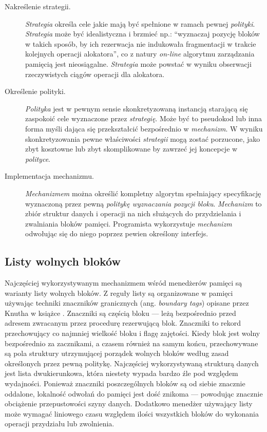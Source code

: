 \documentclass[12pt,a4paper,titlepage,twoside]{mwart}
\begin{document}
\begin{description}

\item[Nakreślenie strategii.] \textit{Strategia} określa cele jakie mają być
spełnione w ramach pewnej \textit{polityki}. \textit{Strategia} może być
idealistyczna i brzmieć np.: ``wyznaczaj pozycję bloków w takich sposób, by ich
rezerwacja nie indukowała fragmentacji w trakcie kolejnych operacji
alokatora'', co z natury \textit{on-line} algorytmu zarządzania pamięcią jest
nieosiągalne.  \textit{Strategia} może powstać w wyniku obserwacji
rzeczywistych ciągów operacji dla alokatora.

\item[Określenie polityki.] \textit{Polityka} jest w pewnym sensie
skonkretyzowaną instancją starającą się zaspokoić cele wyznaczone przez
\textit{strategię}. Może być to pseudokod lub inna forma myśli dająca się
przekształcić bezpośrednio w \textit{mechanizm}. W wyniku skonkretyzowania
pewne właściwości \textit{strategii} mogą zostać porzucone, jako zbyt kosztowne
lub zbyt skomplikowane by zawrzeć jej koncepcje w \textit{polityce}.

\item[Implementacja mechanizmu.] \textit{Mechanizmem} można określić kompletny
algorytm spełniający specyfikację wyznaczoną przez pewną \textit{politykę
wyznaczania pozycji bloku}. \textit{Mechanizm} to zbiór struktur danych i
operacji na nich służących do przydzielania i zwalniania bloków pamięci.
Programista wykorzystuje \textit{mechanizm} odwołując się do niego poprzez
pewien określony interfejs.

\end{description}

\subsection{Listy wolnych bloków}

Najczęściej wykorzystywanym mechanizmem wśród menedżerów pamięci są warianty
listy wolnych bloków. Z reguły listy są organizowane w pamięci używając
techniki znaczników granicznych (ang.  \textit{boundary tags}) opisane przez
Knutha w książce \cite{knuth73fundamental}. Znaczniki są częścią bloku --- leżą
bezpośrednio przed adresem zwracanym przez procedurę rezerwującą blok.
Znaczniki to rekord przechowujący co najmniej wielkość bloku i flagę zajętości.
Kiedy blok jest wolny bezpośrednio za zacznikami, a czasem również na samym
końcu, przechowywane są pola struktury utrzymującej porządek wolnych bloków
według zasad określonych przez pewną politykę. Najczęściej wykorzystywaną
strukturą danych jest lista dwukierunkowa, która niestety wypada bardzo źle pod
względem wydajności. Ponieważ znaczniki poszczególnych bloków są od siebie
znacznie oddalone, lokalność odwołań do pamięci jest dość znikoma --- powodując
znacznie obciążenie przepustowości szyny danych. Dodatkowo menedżer używający
listy może wymagać liniowego czasu względem ilości wszystkich bloków do
wykonania operacji przydziału lub zwolnienia.
\end{document}

